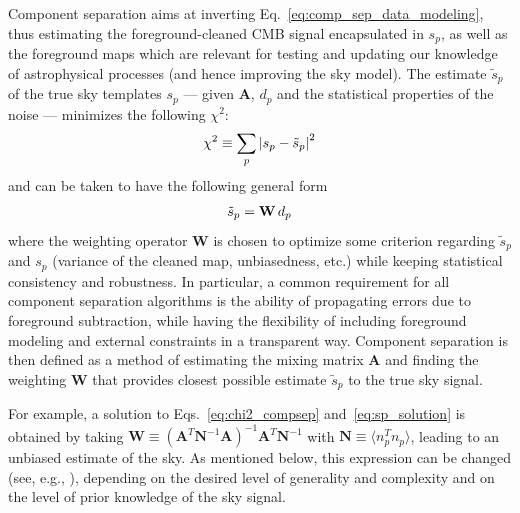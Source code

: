 Component separation aims at inverting Eq.~\ref{eq:comp_sep_data_modeling}, thus estimating the foreground-cleaned CMB signal encapsulated in $s_p$, as well as the foreground maps which are relevant for testing and updating our knowledge of astrophysical processes (and hence improving the sky model).
The estimate $\tilde{s}_p$ of the true sky templates $s_p$ --- given $\mathbf{A}$, $d_p$ and the statistical properties of the noise --- minimizes the following $\chi^2$:
\begin{eqnarray}
	\centering
		\chi^2 \equiv \sum_p \left| s_p - \tilde{s}_p\right|^2
	\label{eq:chi2_compsep}
\end{eqnarray}
and can be taken to have the following general form
\begin{eqnarray}
	\centering
		\tilde{s}_p = \mathbf{W}\,d_p
	\label{eq:sp_solution}
\end{eqnarray}
where the weighting operator $\mathbf{W}$ is chosen to optimize some criterion regarding $\tilde{s}_p$ and $s_p$ (variance of the cleaned map, unbiasedness, etc.) while keeping statistical consistency and robustness. In particular, a common requirement for all component separation algorithms is the ability of propagating errors due to foreground subtraction, while having the flexibility of including foreground modeling and external constraints in a transparent way. 
Component separation is then defined as a method of estimating the mixing matrix $\mathbf{A}$ and finding the weighting $\mathbf{W}$ that provides closest possible estimate $\tilde{s}_p$ to the true sky signal.

For example, a solution to Eqs.~\ref{eq:chi2_compsep} and~\ref{eq:sp_solution} is obtained by taking $\mathbf{W} \equiv \left( \mathbf{A}^T\mathbf{N}^{-1}\mathbf{A} \right)^{-1}\mathbf{A}^T\mathbf{N}^{-1}$ with $\mathbf{N} \equiv \langle n_p^T n_p\rangle$, leading to an unbiased estimate of the sky. As mentioned below, this expression can be changed (see, e.g., \cite{Delabrouille:2009aa}), depending on the desired level of generality and complexity and on the level of prior knowledge of the sky signal.


